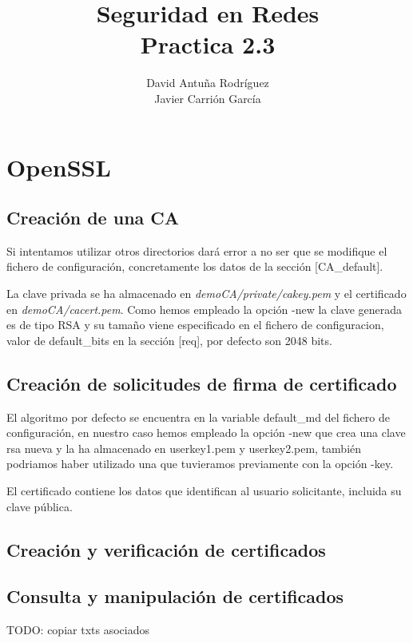 \documentclass[11pt]{article}
\title{\Large Seguridad en Redes\\Practica 2.3}
\author{David Antuña Rodríguez\\Javier Carrión García}
\date{}
\begin{document}
  \raggedright

  \maketitle
  \newpage

  \section{OpenSSL}
    \subsection{Creación de una CA}
      \par
      Si intentamos utilizar otros directorios dará error a no ser que se modifique el fichero de
      configuración, concretamente los datos de la sección [CA\_default].

      \par
      La clave privada se ha almacenado en \textit{demoCA/private/cakey.pem} y el certificado en
      \textit{demoCA/cacert.pem}. Como hemos empleado la opción -new la clave generada es de tipo
      RSA y su tamaño viene especificado en el fichero de configuracion, valor de default\_bits
      en la sección [req], por defecto son 2048 bits.

    \subsection{Creación de solicitudes de firma de certificado}
      \par
      El algoritmo por defecto se encuentra en la variable default\_md del fichero de configuración,
      en nuestro caso hemos empleado la opción -new que crea una clave rsa nueva y la ha almacenado
      en userkey1.pem y userkey2.pem, también podriamos haber utilizado una que tuvieramos
      previamente con la opción -key.
      
      \bigskip
      \par
      El certificado contiene los datos que identifican al usuario solicitante, incluida su clave pública.

    \subsection{Creación y verificación de certificados}

    \subsection{Consulta y manipulación de certificados}
      TODO: copiar txts asociados
\end{document}
